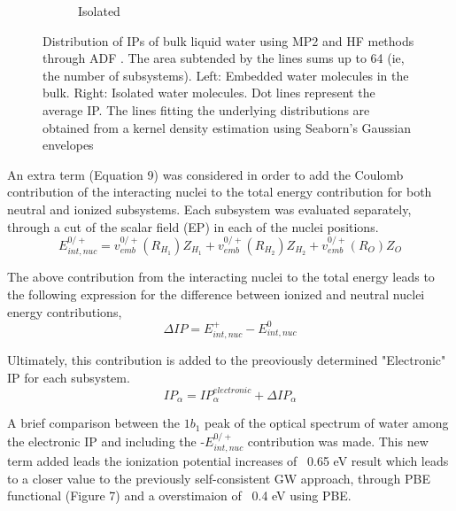 \documentclass[12pt,a4paper]{article}
\begin{document}
\begin{figure}[!ht]
\begin{subfigure}{0.4\linewidth}
                \caption{Isolated}
        \end{subfigure}
        \caption{Distribution of IPs of bulk liquid water using MP2 and HF methods through ADF \cite{te2001chemistry}. The area subtended by the lines sums up to 64 (ie, the number of subsystems). Left: Embedded water molecules in the bulk. Right: Isolated water molecules. Dot lines represent the average IP. The lines fitting the underlying distributions are obtained from a kernel density estimation using Seaborn's Gaussian envelopes\cite{waskom2017c}}
\end{figure}

An extra term (Equation 9) was considered in order to add the Coulomb contribution of the interacting nuclei to the total energy contribution for both neutral and ionized subsystems. 
Each subsystem was evaluated separately, through a cut of the scalar field (EP) in each of the nuclei positions. \\

\begin{equation}
        E_{int,nuc}^{0/+}=v_{emb}^{0/+}(R_{H_1}) Z_{H_1} + v_{emb}^{0/+}(R_{H_2}) Z_{H_2} + v_{emb}^{0/+}(R_{O}) Z_{O}
\end{equation}

The above contribution from the interacting nuclei to the total energy leads to the following expression for the difference between ionized and neutral nuclei energy contributions, \\

\begin{equation}
        \Delta IP = E_{int,nuc}^{+} - E_{int,nuc}^{0}
\end{equation}

Ultimately, this contribution is added to the preoviously determined "Electronic" IP for each subsystem. \\

\begin{equation}
IP_\alpha = IP^{electronic}_\alpha + \Delta IP_\alpha
\end{equation}

A brief comparison between the $1b_{1}$ peak of the optical spectrum of water among the electronic IP and including the -$E_{int,nuc}^{0/+}$ contribution was made.
This new term added leads the ionization potential increases of ~0.65 eV result which leads to a closer value to
the previously self-consistent GW approach, through PBE functional (Figure 7) and a overstimaion of ~0.4 eV using PBE. \\
\end{document}
